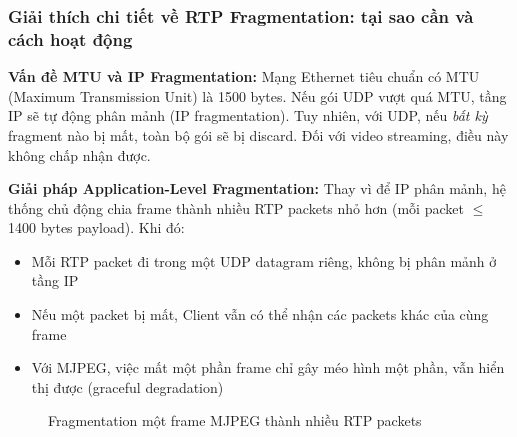 \subsubsection{Giải thích chi tiết về RTP Fragmentation: tại sao cần và cách hoạt động}

\textbf{Vấn đề MTU và IP Fragmentation:} Mạng Ethernet tiêu chuẩn có MTU (Maximum Transmission Unit) là 1500 bytes. Nếu gói UDP vượt quá MTU, tầng IP sẽ tự động phân mảnh (IP fragmentation). Tuy nhiên, với UDP, nếu \textit{bất kỳ} fragment nào bị mất, toàn bộ gói sẽ bị discard. Đối với video streaming, điều này không chấp nhận được.

\textbf{Giải pháp Application-Level Fragmentation:} Thay vì để IP phân mảnh, hệ thống chủ động chia frame thành nhiều RTP packets nhỏ hơn (mỗi packet $\leq$ 1400 bytes payload). Khi đó:
\begin{itemize}
\item Mỗi RTP packet đi trong một UDP datagram riêng, không bị phân mảnh ở tầng IP
\item Nếu một packet bị mất, Client vẫn có thể nhận các packets khác của cùng frame
\item Với MJPEG, việc mất một phần frame chỉ gây méo hình một phần, vẫn hiển thị được (graceful degradation)
\end{itemize}

\begin{figure}[H]
\centering
{}
\caption{Fragmentation một frame MJPEG thành nhiều RTP packets}
\label{fig:rtp_fragmentation}
\end{figure}

